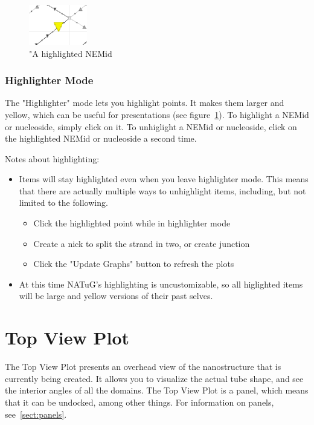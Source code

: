 \documentclass[titlepage]{article}
\begin{document}
\begin{figure} \label{fig:highlighted-NEMid}
	\centering
	\includegraphics[width=1in]{highlighted-nemid.png}
	\caption{"A highlighted NEMid}
\end{figure}

\subsubsection{Highlighter Mode}

The "Highlighter" mode lets you highlight points. It makes them larger and yellow, which can be useful for presentations (see figure~\ref{fig:highlighted-NEMid}). 
To highlight a NEMid or nucleoside, simply click on it. To unhiglight a NEMid or nucleoside, click on the highlighted NEMid or nucleoside a second time.

Notes about highlighting:
\begin{itemize}
	\item Items will stay highlighted even when you leave highlighter mode. This means that there are actually multiple ways to unhighlight items, including, but not limited to the following.
	\begin{itemize}
		\item Click the highlighted point while in highlighter mode
		\item Create a nick to split the strand in two, or create junction
		\item Click the "Update Graphs" button to refresh the plots
	\end{itemize}

	\item At this time NATuG's highlighting is uncustomizable, so all higlighted items will be large and yellow versions of their past selves.
\end{itemize}

\section{Top View Plot}

The Top View Plot presents an overhead view of the nanostructure that is currently being created. It allows you to visualize the actual tube shape, and see the interior angles of all the domains. The Top View Plot is a panel, which means that it can be undocked, among other things. For information on panels, see~\ref{sect:panels}.
\end{document}

